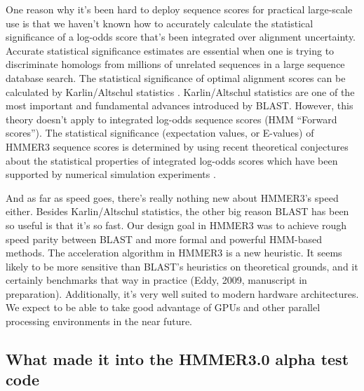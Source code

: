 One reason why it's been hard to deploy sequence scores for practical
large-scale use is that we haven't known how to accurately calculate
the statistical significance of a log-odds score that's been
integrated over alignment uncertainty. Accurate statistical
significance estimates are essential when one is trying to
discriminate homologs from millions of unrelated sequences in a large
sequence database search. The statistical significance of optimal
alignment scores can be calculated by Karlin/Altschul statistics
\citep{Karlin90,KarlinAltschul93}. Karlin/Altschul statistics are one
of the most important and fundamental advances introduced by BLAST.
However, this theory doesn't apply to integrated log-odds sequence
scores (HMM ``Forward scores'').  The statistical significance
(expectation values, or E-values) of HMMER3 sequence scores is
determined by using recent theoretical conjectures about the
statistical properties of integrated log-odds scores which have been
supported by numerical simulation experiments \citep{Eddy08}.

And as far as speed goes, there's really nothing new about HMMER3's
speed either. Besides Karlin/Altschul statistics, the other big reason
BLAST has been so useful is that it's so fast.  Our design goal in
HMMER3 was to achieve rough speed parity between BLAST and more formal
and powerful HMM-based methods.  The acceleration algorithm in HMMER3
is a new heuristic. It seems likely to be more sensitive than BLAST's
heuristics on theoretical grounds, and it certainly benchmarks that
way in practice (Eddy, 2009, manuscript in preparation). Additionally,
it's very well suited to modern hardware architectures. We expect to
be able to take good advantage of GPUs and other parallel processing
environments in the near future.



\subsection{What made it into the HMMER3.0 alpha test code}

